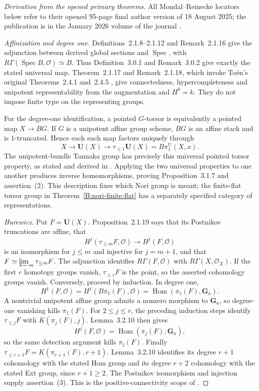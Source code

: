 \begin{proof}[Derivation from the opened primary theorems]
All Mondal--Reinecke locators below refer to their opened 95-page final
author version of 18 August 2025; the publication is in the January 2026
volume of the journal \cite{BMondalReinecke2026}.

\emph{Affinization and degree one.}
Definitions~2.1.8--2.1.12 and Remark~2.1.16 give the adjunction
between derived global sections and $\operatorname{Spec}$, with
$R\Gamma(\operatorname{Spec}B,\mathcal O)\simeq B$.
Thus Definition~3.0.1 and Remark~3.0.2 give exactly the stated
universal map. Theorem~2.1.17 and Remark~2.1.18, which invoke
To\"en's original Theorems~2.4.1 and~2.4.5
\cite[pp.~51--61]{BToen2006}, give connectedness, hypercompleteness
and unipotent representability from the augmentation and $H^0=k$.
They do not impose finite type on the representing groups.

For the degree-one identification, a pointed $G$-torsor is equivalently
a pointed map $X\to BG$. If $G$ is a unipotent affine group scheme,
$BG$ is an affine stack and is $1$-truncated. Hence each such map
factors uniquely through
\[
 X\longrightarrow\mathbf U(X)\longrightarrow
 \tau_{\le1}\mathbf U(X)=B\pi_1^{\mathrm U}(X,x).
\]
The unipotent-bundle Tannaka group has precisely this universal pointed
torsor property, as stated and derived in
\cite[Definition~3.1.1, Lemmas~3.1.2--3.1.6]{BMondalReinecke2026}.
Applying the two universal properties to one another produces inverse
homomorphisms, proving Proposition~3.1.7 and assertion~(2).
This description fixes which Nori group is meant; the finite-flat
torsor group in Theorem~\ref{B:nori-finite-flat} has a separately
specified category of representations.

\emph{Hurewicz.}
Put $F=\mathbf U(X)$. Proposition~2.1.19 says that its Postnikov
truncations are affine, that
\[
 H^j(\tau_{\le m}F,\mathcal O)\longrightarrow H^j(F,\mathcal O)
\]
is an isomorphism for $j\le m$ and injective for $j=m+1$, and that
$F\simeq\varprojlim_m\tau_{\le m}F$.
The adjunction identifies $R\Gamma(F,\mathcal O)$ with
$R\Gamma(X,\mathcal O_X)$. If the first $r$ homotopy groups vanish,
$\tau_{\le r}F$ is the point, so the asserted cohomology groups vanish.
Conversely, proceed by induction. In degree one,
\[
 H^1(F,\mathcal O)
  =H^1(B\pi_1(F),\mathcal O)
  =\operatorname{Hom}(\pi_1(F),\mathbf G_a).
\]
A nontrivial unipotent affine group admits a nonzero morphism to
$\mathbf G_a$, so degree-one vanishing kills $\pi_1(F)$.
For $2\le j\le r$, the preceding induction steps identify
$\tau_{\le j}F$ with $K(\pi_j(F),j)$. Lemma~3.2.10 then gives
\[
 H^j(F,\mathcal O)=\operatorname{Hom}(\pi_j(F),\mathbf G_a),
\]
so the same detection argument kills $\pi_j(F)$.
Finally $\tau_{\le r+1}F=K(\pi_{r+1}(F),r+1)$.
Lemma~3.2.10 identifies its degree $r+1$ cohomology with the stated
Hom group and its degree $r+2$ cohomology with the stated Ext group,
since $r+1\ge2$. The Postnikov isomorphism and injection supply
assertion~(3). This is the positive-connectivity scope of
\cite[Proposition~3.2.11 and Corollary~3.2.12]{BMondalReinecke2026}.


\end{proof}
